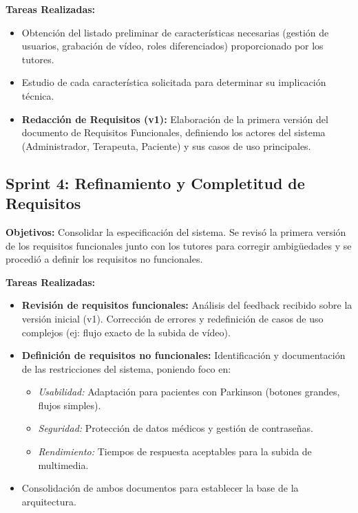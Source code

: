 \textbf{Tareas Realizadas:}
\begin{itemize}
    \item Obtención del listado preliminar de características necesarias (gestión de usuarios, grabación de vídeo, roles diferenciados) proporcionado por los tutores.
    \item Estudio de cada característica solicitada para determinar su implicación técnica.
    \item \textbf{Redacción de Requisitos (v1):} Elaboración de la primera versión del documento de Requisitos Funcionales, definiendo los actores del sistema (Administrador, Terapeuta, Paciente) y sus casos de uso principales.
\end{itemize}

\subsection{Sprint 4: Refinamiento y Completitud de Requisitos}
\textbf{Objetivos:} Consolidar la especificación del sistema. Se revisó la primera versión de los requisitos funcionales junto con los tutores para corregir ambigüedades y se procedió a definir los requisitos no funcionales.

\textbf{Tareas Realizadas:}
\begin{itemize}
    \item \textbf{Revisión de requisitos funcionales:} Análisis del feedback recibido sobre la versión inicial (v1). Corrección de errores y redefinición de casos de uso complejos (ej: flujo exacto de la subida de vídeo).
    \item \textbf{Definición de requisitos no funcionales:} Identificación y documentación de las restricciones del sistema, poniendo foco en:
    \begin{itemize}
        \item \textit{Usabilidad:} Adaptación para pacientes con Parkinson (botones grandes, flujos simples).
        \item \textit{Seguridad:} Protección de datos médicos y gestión de contraseñas.
        \item \textit{Rendimiento:} Tiempos de respuesta aceptables para la subida de multimedia.
    \end{itemize}
    \item Consolidación de ambos documentos para establecer la base de la arquitectura.
\end{itemize}

